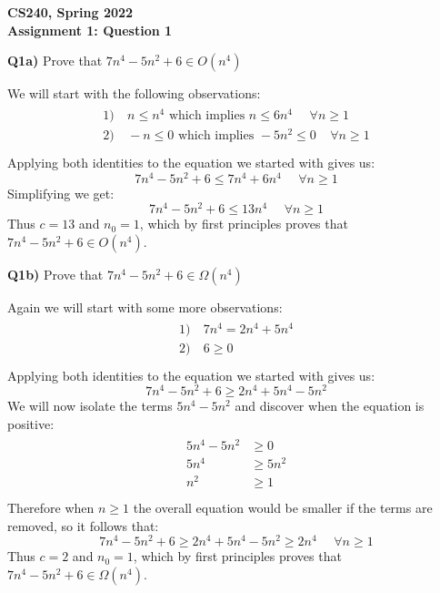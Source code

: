 \documentclass[12pt]{article}
\begin{document}
\begin{center}
{\Large\textbf{CS240, Spring 2022}}\\
\vspace{2mm}
{\Large\textbf{Assignment 1: Question 1}}\\
\vspace{3mm}
\end{center}
\[ \]
\textbf{Q1a)} Prove that $7n^4-5n^2+6 \in O(n^4)$\\
\begin{adjustwidth}{0em}{0pt}
We will start with the following observations:
\begin{align*}
    \begin{aligned}
       1)& \ n \leq n^4 \textrm{  which implies   } n \leq 6n^4 \ \ \ \ \ \ \forall n \geq 1\\
    	   2)& \ -n \leq 0 \textrm{  which implies   } -5n^2 \leq 0 \ \ \ \  \ \forall n \geq 1\\
    \end{aligned}
\end{align*}
Applying both identities to the equation we started with gives us: 
\[ 7n^4-5n^2+6 \leq 7n^4+6n^4  \ \ \ \ \ \ \forall n \geq 1 \]
Simplifying we get:
\[ 7n^4-5n^2+6 \leq 13n^4  \ \ \ \ \ \ \forall n \geq 1 \]
Thus {\boldmath$c = 13$} and {\boldmath$n_0 = 1$}, which by first principles proves that  $7n^4-5n^2+6 \in O(n^4)$.
\end{adjustwidth} 
\[ \]
\[ \]
\textbf{Q1b)} Prove that $7n^4-5n^2+6 \in \Omega(n^4)$\\
\begin{adjustwidth}{0pt}{0pt}
Again we will start with some more observations:
\begin{align*}
    \begin{aligned}
       1)& \ 7n^4 = 2n^4 + 5n^4 \\
    	   2)& \ 6 \geq 0 \\
    \end{aligned}
\end{align*}
Applying both identities to the equation we started with gives us: 
\[ 7n^4 - 5n^2 + 6 \geq 2n^4 + 5n^4 -5n^2 \]
We will now isolate the terms $5n^4 -5n^2$ and discover when the equation is positive:
\begin{align*}
    \begin{aligned}
       5n^4 -5n^2 &\geq 0 \\
    	   5n^4 &\geq 5n^2 \\
    	   n^2 &\geq 1 \\
    \end{aligned}
\end{align*}
Therefore when $n \geq 1$ the overall equation would be smaller if the terms are removed, so it follows that:
\[ 7n^4 - 5n^2 + 6 \geq 2n^4 + 5n^4 -5n^2 \geq 2n^4 \ \ \ \ \ \ \forall n \geq 1 \]
Thus {\boldmath$c = 2$} and {\boldmath$n_0 = 1$}, which by first principles proves that  $7n^4-5n^2+6 \in \Omega(n^4)$.
\end{adjustwidth}
\end{document}
